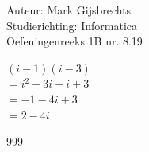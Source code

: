 \documentclass[a4paper]{article}
\begin{document}
\noindent \large Auteur: Mark Gijsbrechts \\
\noindent \large Studierichting: Informatica\\
\noindent \large Oefeningenreeks 1B nr. 8.19\\

\medskip

\normalsize

$\left(i - 1\right) \left(i - 3\right)$ \\

$= i^2 -3i -i +3$ \\

$= -1 - 4i + 3$ \\

$= 2 - 4i$



\begin{thebibliography}{999}
\end{thebibliography}
\end{document}
